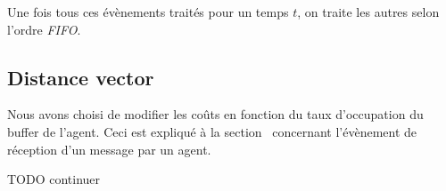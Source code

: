 \documentclass[a4paper,11pt]{article}
\begin{document}
Une fois tous ces évènements traités pour un temps $t$, on traite les autres selon l'ordre \textit{FIFO}.

\subsection{Distance vector}
Nous avons choisi de modifier les coûts en fonction du taux d'occupation du buffer de l'agent. Ceci est expliqué à la section \ concernant l'évènement de réception d'un message par un agent.

TODO continuer




\clearpage


\appendix
\end{document}
